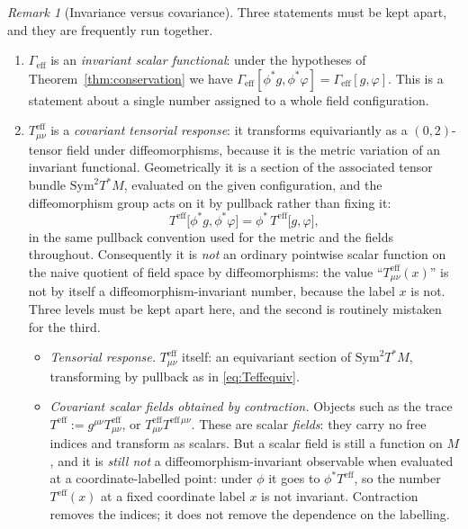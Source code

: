 \documentclass[11pt,reqno]{amsart}
\numberwithin{equation}{section}
\theoremstyle{plain}
\theoremstyle{definition}
\theoremstyle{remark}
\newtheorem{remark}[theorem]{Remark}
\newcommand{\Geff}{\Gamma_{\mathrm{eff}}}
\begin{document}
\begin{remark}[Invariance versus covariance]
\label{rem:invcov}
Three statements must be kept apart, and they are frequently run together.
\begin{enumerate}
\item $\Geff$ is an \emph{invariant scalar functional}: under the hypotheses of
Theorem~\ref{thm:conservation} we have
$\Geff[\phi^{*}g,\phi^{*}\varphi]=\Geff[g,\varphi]$.
This is a statement about a single number assigned to a whole field
configuration.
\item $T^{\mathrm{eff}}_{\mu\nu}$ is a \emph{covariant tensorial response}: it transforms
equivariantly as a $(0,2)$-tensor field under diffeomorphisms, because it is the metric
variation of an invariant functional. Geometrically it is a section of the associated tensor
bundle $\mathrm{Sym}^{2}T^{*}M$, evaluated on the given configuration, and the diffeomorphism
group acts on it by pullback rather than fixing it:
\begin{equation}
\label{eq:Teffequiv}
T^{\mathrm{eff}}\bigl[\phi^{*}g,\phi^{*}\varphi\bigr]
=\phi^{*}\,T^{\mathrm{eff}}\bigl[g,\varphi\bigr],
\end{equation}
in the same pullback convention used for the metric and the fields throughout. Consequently it
is \emph{not} an
ordinary pointwise scalar function on the naive quotient of field space by diffeomorphisms:
the value ``$T^{\mathrm{eff}}_{\mu\nu}(x)$'' is not by itself a diffeomorphism-invariant
number, because the label $x$ is not. Three levels must be kept apart here, and the second is
routinely mistaken for the third.
\begin{itemize}
\item \emph{Tensorial response.} $T^{\mathrm{eff}}_{\mu\nu}$ itself: an equivariant section of
$\mathrm{Sym}^{2}T^{*}M$, transforming by pullback as in \eqref{eq:Teffequiv}.
\item \emph{Covariant scalar fields obtained by contraction.} Objects such as the trace
$T^{\mathrm{eff}}:=g^{\mu\nu}T^{\mathrm{eff}}_{\mu\nu}$, or
$T^{\mathrm{eff}}_{\mu\nu}T^{\mathrm{eff}\,\mu\nu}$. These are scalar \emph{fields}: they carry
no free indices and transform as scalars. But a scalar field is still a function on $M$, and it
is \emph{still not} a diffeomorphism-invariant observable when evaluated at a
coordinate-labelled point: under $\phi$ it goes to $\phi^{*}T^{\mathrm{eff}}$, so the number
$T^{\mathrm{eff}}(x)$ at a fixed coordinate label $x$ is not invariant. Contraction removes the
indices; it does not remove the dependence on the labelling.

\end{itemize}
\end{enumerate}
\end{remark}
\end{document}
